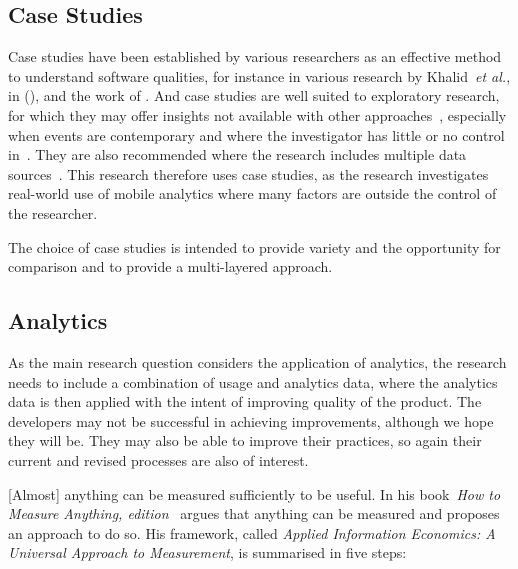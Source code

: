 \subsection{Case Studies}
Case studies have been established by various researchers as an effective method to understand software qualities, for instance in various research by Khalid~\emph{et al.}, in (\citeyear{khalid2014_prioritizing_the_devices_to_test_your_app_on_casestudy_android_games, khalid2015_what_do_mobile_app_users_complain_about, khalid2016_examining_the_relationship_between_findbugs_warnings_and_app_ratings}), and the work of . And case studies are well suited to exploratory research, for which they may offer insights not available with other approaches~, especially when events are contemporary and where the investigator has little or no control in~. They are also recommended where the research includes multiple data sources~. This research therefore uses case studies, as the research investigates real-world use of mobile analytics where many factors are outside the control of the researcher.

The choice of case studies is intended to provide variety and the opportunity for comparison and to provide a multi-layered approach.


\subsection{Analytics}
As the main research question considers the application of analytics, the research needs to include a combination of usage and analytics data, where the analytics data is then applied with the intent of improving quality of the product. The developers may not be successful in achieving improvements, although we hope they will be. They may also be able to improve their practices, so again their current and revised processes are also of interest.

[Almost] anything can be measured sufficiently to be useful. In his book~\emph{How to Measure Anything,  edition}~ argues that anything can be measured and proposes an approach to do so. His framework, called \emph{Applied Information Economics: A Universal Approach to Measurement}, is summarised in five steps:


